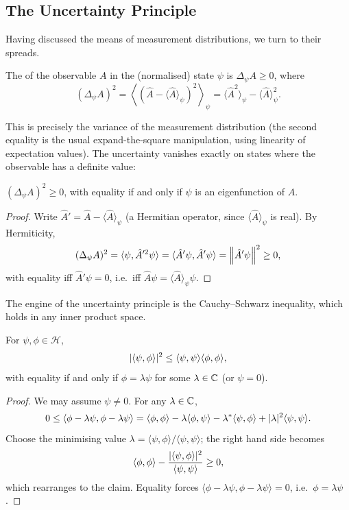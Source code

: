 \documentclass[a4paper]{scrartcl}
\newcommand{\inp}[2]{\langle #1, #2 \rangle}
\begin{document}
\subsection{The Uncertainty Principle}

Having discussed the means of measurement distributions, we turn to their spreads.

\begin{definition}[Uncertainty]
    The  of the observable $A$ in the (normalised) state $\psi$ is $\Delta_\psi A \geq 0$, where
    $$
    (\Delta_\psi A)^2 = \left\langle (\hat{A} - \langle \hat{A} \rangle_\psi)^2 \right\rangle_\psi = \langle \hat{A}^2 \rangle_\psi - \langle \hat{A} \rangle_\psi^2.
    $$
\end{definition}

This is precisely the variance of the measurement distribution (the second equality is the usual expand-the-square manipulation, using linearity of expectation values). The uncertainty vanishes exactly on states where the observable has a definite value:

\begin{lemma}
    $(\Delta_\psi A)^2 \geq 0$, with equality if and only if $\psi$ is an eigenfunction of $\hat{A}$.
\end{lemma}
\begin{proof}
    Write $\hat{A}' = \hat{A} - \langle \hat{A} \rangle_\psi$ (a Hermitian operator, since $\langle \hat A \rangle_\psi$ is real). By Hermiticity,
    $$
    (\Delta_\psi A)^2 = \inp{\psi}{\hat{A}'^2 \psi} = \inp{\hat{A}' \psi}{\hat{A}' \psi} = \norm{\hat{A}' \psi}^2 \geq 0,
    $$
    with equality iff $\hat{A}'\psi = 0$, i.e.\ iff $\hat{A} \psi = \langle \hat{A}\rangle_\psi \psi$.
\end{proof}

The engine of the uncertainty principle is the Cauchy--Schwarz inequality, which holds in any inner product space.

\begin{theorem}
    For $\psi, \phi \in \mathcal{H}$,
    $$
    \abs{\inp{\psi}{\phi}}^2 \leq \inp{\psi}{\psi} \inp{\phi}{\phi},
    $$
    with equality if and only if $\phi = \lambda \psi$ for some $\lambda \in \mathbb{C}$ (or $\psi = 0$).
\end{theorem}
\begin{proof}
    We may assume $\psi \neq 0$. For any $\lambda \in \mathbb{C}$,
    $$
    0 \leq \inp{\phi - \lambda \psi}{\phi - \lambda \psi} = \inp{\phi}{\phi} - \lambda \inp{\phi}{\psi} - \lambda^* \inp{\psi}{\phi} + \abs{\lambda}^2 \inp{\psi}{\psi}.
    $$
    Choose the minimising value $\lambda = \inp{\psi}{\phi} / \inp{\psi}{\psi}$; the right hand side becomes
    $$
    \inp{\phi}{\phi} - \frac{\abs{\inp{\psi}{\phi}}^2}{\inp{\psi}{\psi}} \geq 0,
    $$
    which rearranges to the claim. Equality forces $\inp{\phi - \lambda\psi}{\phi - \lambda \psi} = 0$, i.e.\ $\phi = \lambda \psi$.
\end{proof}
\end{document}
